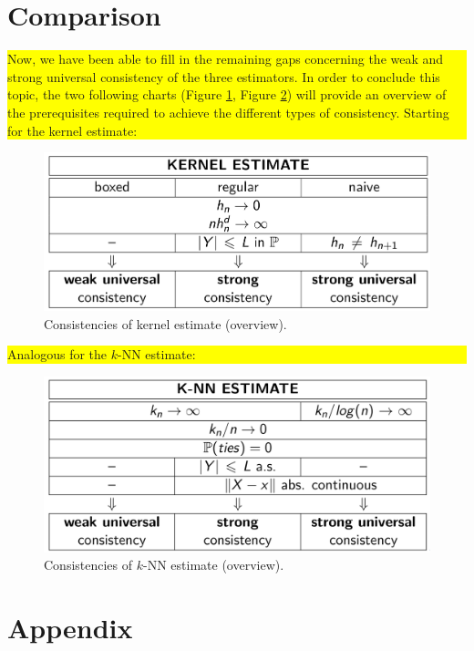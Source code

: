 \section{Comparison}
\colorbox{yellow}{\parbox{10cm}{
Now, we have been able to fill in the remaining gaps concerning the weak and strong universal consistency of the three estimators. In order to conclude this topic, the two following charts (Figure \ref{comp_kernel}, Figure \ref{comp_knn}) will provide an overview of the prerequisites required to achieve the different types of consistency. Starting for the kernel estimate:}}

\begin{figure}[h] \label{comp_kernel}
    \includegraphics[scale=0.15]{comp_kernel.jpeg}
    \centering
    \caption{Consistencies of kernel estimate (overview).}
\end{figure}

\colorbox{yellow}{\parbox{10cm}{Analogous for the $k$-NN estimate:}}

\begin{figure}[h] \label{comp_knn}
    \includegraphics[scale=0.139]{comp_knn.jpeg}
    \centering
    \caption{Consistencies of $k$-NN estimate (overview).}
\end{figure}


\newpage

\appendix
\section{Appendix}

